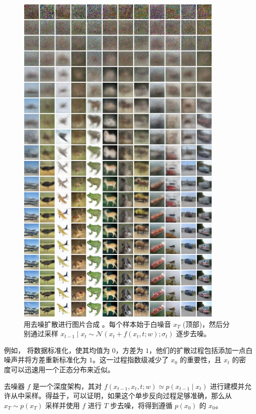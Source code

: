 \begin{figure}
    \centering
    \includegraphics[width=0.9\textwidth]{fig/fig7.2.png}
    \caption[去噪扩散]{用去噪扩散进行图片合成 \citep{arxiv-2006.11239}。每个样本始于白噪音 $x_T$ (顶部)，然后分别通过采样 $x_{t-1} \mid x_t \sim \mathcal{N} (x_t + f(x_t,t;w);\sigma_t)$ 逐步去噪。}
    \label{fig7.2}
\end{figure}

例如，\cite{arxiv-2006.11239} 将数据标准化，使其均值为 $0$，方差为 $1$，他们的扩散过程包括添加一点白噪声并将方差重新标准化为 $1$。这一过程指数级减少了 $x_0$ 的重要性，且 $x_t$ 的密度可以迅速用一个正态分布来近似。

去噪器 $f$ 是一个深度架构，其对 $f(x_{t-1},x_t,t;w) \simeq p(x_{t-1} \mid x_t)$ 进行建模并允许从中采样。得益于，可以证明，如果这个单步反向过程足够准确，那么从 $x_T \sim p(x_T)$ 采样并使用 $f$ 进行 $T$ 步去噪，将得到遵循 $p(x_0)$ 的 $x_0$。

